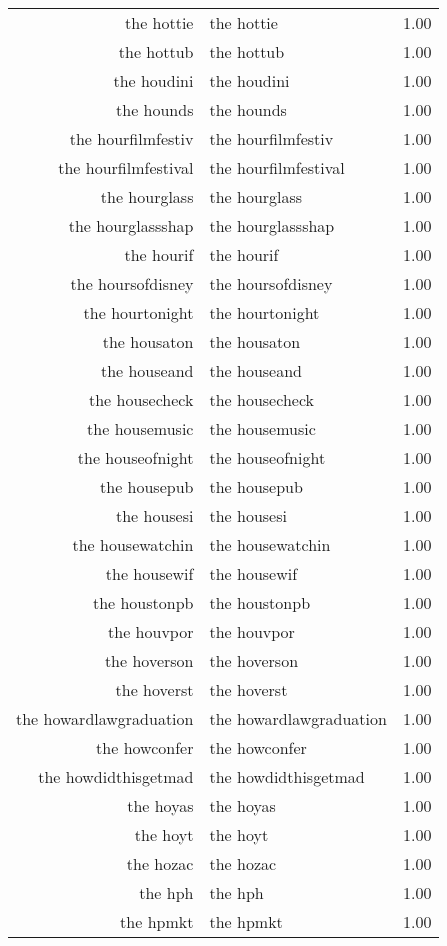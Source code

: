 \begin{table}[ht]
\begin{tabular}{rlr}
  the hottie & the hottie & 1.00 \\ 
  the hottub & the hottub & 1.00 \\ 
  the houdini & the houdini & 1.00 \\ 
  the hounds & the hounds & 1.00 \\ 
  the hourfilmfestiv & the hourfilmfestiv & 1.00 \\ 
  the hourfilmfestival & the hourfilmfestival & 1.00 \\ 
  the hourglass & the hourglass & 1.00 \\ 
  the hourglassshap & the hourglassshap & 1.00 \\ 
  the hourif & the hourif & 1.00 \\ 
  the hoursofdisney & the hoursofdisney & 1.00 \\ 
  the hourtonight & the hourtonight & 1.00 \\ 
  the housaton & the housaton & 1.00 \\ 
  the houseand & the houseand & 1.00 \\ 
  the housecheck & the housecheck & 1.00 \\ 
  the housemusic & the housemusic & 1.00 \\ 
  the houseofnight & the houseofnight & 1.00 \\ 
  the housepub & the housepub & 1.00 \\ 
  the housesi & the housesi & 1.00 \\ 
  the housewatchin & the housewatchin & 1.00 \\ 
  the housewif & the housewif & 1.00 \\ 
  the houstonpb & the houstonpb & 1.00 \\ 
  the houvpor & the houvpor & 1.00 \\ 
  the hoverson & the hoverson & 1.00 \\ 
  the hoverst & the hoverst & 1.00 \\ 
  the howardlawgraduation & the howardlawgraduation & 1.00 \\ 
  the howconfer & the howconfer & 1.00 \\ 
  the howdidthisgetmad & the howdidthisgetmad & 1.00 \\ 
  the hoyas & the hoyas & 1.00 \\ 
  the hoyt & the hoyt & 1.00 \\ 
  the hozac & the hozac & 1.00 \\ 
  the hph & the hph & 1.00 \\ 
  the hpmkt & the hpmkt & 1.00 \\ 

\end{tabular}
\end{table}
